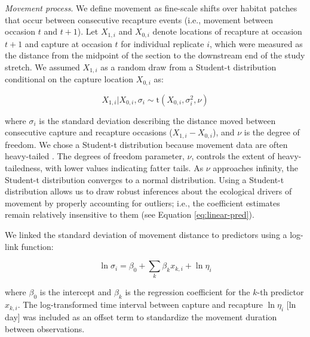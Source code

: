 \documentclass[11pt, class=article, crop=false]{standalone}
\begin{document}
\textit{Movement process}. We define movement as fine-scale shifts over habitat patches that occur between consecutive recapture events (i.e., movement between occasion $t$ and $t+1$). Let $X_{1,i}$ and $X_{0,i}$ denote locations of recapture at occasion $t+1$ and capture at occasion $t$ for individual replicate $i$, which were measured as the distance from the midpoint of the section to the downstream end of the study stretch. We assumed $X_{1,i}$ as a random draw from a Student-t distribution conditional on the capture location $X_{0,i}$ as:    

\begin{equation}
    X_{1, i}|X_{0, i}, \sigma_i \sim \text{t}(X_{0, i}, \sigma_i^2, \nu)
    \label{eq:normal}
\end{equation}

where $\sigma_i$ is the standard deviation describing the distance moved between consecutive capture and recapture occasions ($X_{1,i} - X_{0,i}$), and $\nu$ is the degree of freedom.
We chose a Student-t distribution because movement data are often heavy-tailed \citep{clobertDispersalEcologyEvolution2012}.
The degrees of freedom parameter, $\nu$, controls the extent of heavy-tailedness, with lower values indicating fatter tails. As $\nu$ approaches infinity, the Student-t distribution converges to a normal distribution.
Using a Student-t distribution allows us to draw robust inferences about the ecological drivers of movement by properly accounting for outliers; i.e., the coefficient estimates remain relatively insensitive to them (see Equation \ref{eq:linear-pred}).

We linked the standard deviation of  movement distance to predictors using a log-link function: 

\begin{equation}
    \ln \sigma_i = \beta_0 + \sum_{k} \beta_k x_{k,i} + \ln \eta_i
    \label{eq:linear-pred}
\end{equation}

where $\beta_0$ is the intercept and $\beta_k$ is the regression coefficient for the $k$-th predictor $x_{k,i}$. The log-transformed time interval between capture and recapture $\ln \eta_i$ [ln day] was included as an offset term to standardize the movement duration between observations.
\end{document}
